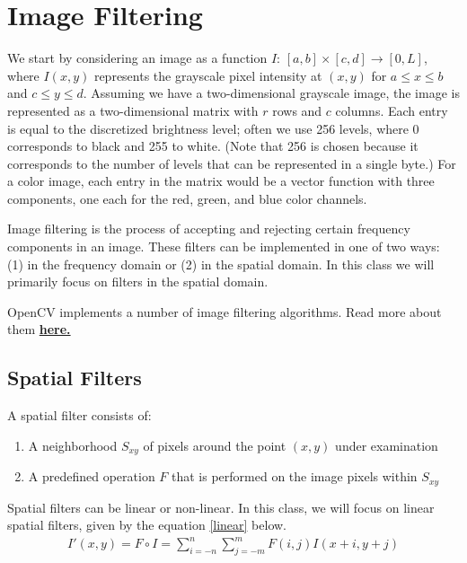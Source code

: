 \documentclass[twoside]{article}
\begin{document}
\section{Image Filtering}
We start by considering an image as a function $I$: $[a,b]\times[c,d] \rightarrow [0,L]$, where $I(x,y)$ represents the grayscale pixel intensity at $(x,y)$ for $a\leq x \leq b$ and $c \leq y \leq d$. Assuming we have a two-dimensional grayscale image, the image is represented as a two-dimensional matrix with $r$ rows and $c$ columns. Each entry is equal to the discretized brightness level; often we use 256 levels, where 0 corresponds to black and 255 to white. (Note that 256 is chosen because it corresponds to the number of levels that can be represented in a single byte.) For a color image, each entry in the matrix would be a vector function with three components, one each for the red, green, and blue color channels.

Image filtering is the process of accepting and rejecting certain frequency components in an image. These filters can be implemented in one of two ways: (1) in the frequency domain or (2) in the spatial domain. In this class we will primarily focus on filters in the spatial domain.

OpenCV implements a number of image filtering algorithms. Read more about them \href{https://docs.opencv.org/3.0-beta/modules/imgproc/doc/filtering.html}{\textbf{here.}}

\subsection{Spatial Filters}
A spatial filter consists of:
\begin{enumerate}
  \item A neighborhood $S_{xy}$ of pixels around the point $(x,y)$ under examination
  \item A predefined operation $F$ that is performed on the image pixels within $S_{xy}$
\end{enumerate}

Spatial filters can be linear or non-linear. In this class, we will focus on linear spatial filters, given by the equation \ref{linear} below.
\begin{equation}
  \label{linear}
  \begin{aligned}
    I'(x,y) = F \circ I = \sum_{i=-n}^n \sum_{j=-m}^m F(i,j)I(x+i,y+j)\\
  \end{aligned}
\end{equation}
\end{document}
